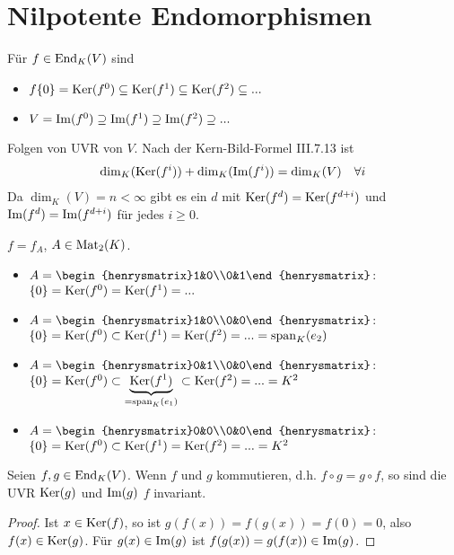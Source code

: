 \section{Nilpotente Endomorphismen}

\begin{remark}
	Für $f\in\operatorname{End}_K(V)$ sind 
	\begin{itemize}
		\item $f\{0\}=\operatorname{Ker}(f^0)\subseteq \operatorname{Ker}(f^1)\subseteq \operatorname{Ker}(f^2)\subseteq ...$
		\item $V=\operatorname{Im}(f^0)\supseteq \operatorname{Im}(f^1)\supseteq \operatorname{Im}(f^2)\supseteq ...$
	\end{itemize}
Folgen von UVR von $V$. Nach der Kern-Bild-Formel III.7.13 ist %
\begin{align}
	\dim_K(\operatorname{Ker}(f^i))+\dim_K(\operatorname{Im}(f^i))=\dim_K(V)\quad\forall i\notag
\end{align}
Da $\dim_K(V)=n<\infty$ gibt es ein $d$ mit $\operatorname{Ker}(f^d)=\operatorname{Ker}(f^{d+i})$ und $\operatorname{Im}(f^d)=\operatorname{Im}(f^{d+i})$ für jedes $i\ge 0$.
\end{remark}

\begin{example}
	$f=f_A$, $A\in\operatorname{Mat}_2(K)$.
	\begin{itemize}
		\item $A=\begin{henrysmatrix}1&0\\0&1\end{henrysmatrix}$: $\{0\}=\operatorname{Ker}(f^0)=\operatorname{Ker}(f^1)=...$
		\item $A=\begin{henrysmatrix}1&0\\0&0\end{henrysmatrix}$: $\{0\}=\operatorname{Ker}(f^0)\subset\operatorname{Ker}(f^1)=\operatorname{Ker}(f^2)=...=\operatorname{span}_K(e_2)$
		\item $A=\begin{henrysmatrix}0&1\\0&0\end{henrysmatrix}$: $\{0\}=\operatorname{Ker}(f^0)\subset\underbrace{\operatorname{Ker}(f^1)}_{=\operatorname{span}_K(e_1)}\subset \operatorname{Ker}(f^2)=... = K^2$
		\item $A=\begin{henrysmatrix}0&0\\0&0\end{henrysmatrix}$: $\{0\}=\operatorname{Ker}(f^0)\subset\operatorname{Ker}(f^1)=\operatorname{Ker}(f^2)=...=K^2$
	\end{itemize}
\end{example}

\begin{lemma}
	Seien $f,g\in\operatorname{End}_K(V)$. Wenn $f$ und  $g$ kommutieren, d.h. $f\circ g=g\circ f$, so sind die UVR $\operatorname{Ker}(g)$ und $\operatorname{Im}(g)$ $f$ invariant.
\end{lemma}
\begin{proof}
	Ist $x\in\operatorname{Ker}(f)$, so ist $g(f(x))=f(g(x))=f(0)=0$, also $f(x)\in\operatorname{Ker}(g)$. Für $g(x)\in\operatorname{Im}(g)$ ist $f(g(x))=g(f(x))\in\operatorname{Im}(g)$.
\end{proof}

